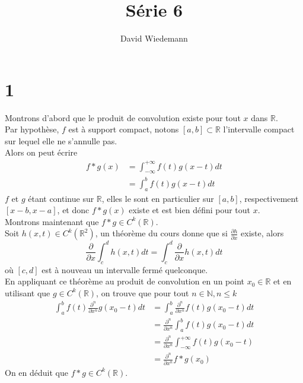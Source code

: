 \documentclass[11pt, a4paper]{article}
\newcommand{\del}{\partial}
\begin{document}
\title{Série 6}
\author{David Wiedemann}
\maketitle
\section*{1}
Montrons d'abord que le produit de convolution existe pour tout $x$ dans $\mathbb{R}$.\\
Par hypothèse, $f$ est à support compact, notons $[a,b]\subset \mathbb{R}$ l'intervalle compact sur lequel elle ne s'annulle pas.\\
Alors on peut écrire
\begin{align*}
	f \ast g ( x) &= \int_{-\infty}^{+\infty} f( t) g( x-t) dt\\
		      &= \int_{ a }^{ b } f( t) g( x-t) dt
\end{align*}
$f$ et $g$ étant continue sur $\mathbb{R}$, elles le sont en particulier sur $[a,b]$, respectivement $[x-b,x-a]$, et donc $f \ast g( x) $ existe et est bien défini pour tout $x$.\\
Montrons maintenant que $f\ast g\in C^{k}( \mathbb{R}) $.\\
Soit $h( x,t) \in C^{k}( \mathbb{R}^{2}) $, un théorème du cours donne que  si $ \frac{\del h}{\del x}$ existe, alors
\[ 
	\frac{\del }{\del x} \int_{ c }^{ d } h( x,t) dt = \int_{ c }^{ d } \frac{\del}{ \del x}h( x,t) dt
\]
où $[c,d]$ est à nouveau un intervalle fermé quelconque.\\
En appliquant ce théorème au produit de convolution  en un point $x_0 \in \mathbb{R}$ et en utilisant que $g \in C^{k}( \mathbb{R}) $, on trouve que pour tout $n \in \mathbb{N}, n \leq k$
\begin{align*}
	\int_{ a }^{ b } f( t)  \frac{\del^{n} }{\del x^{n}} g( x_0-t) dt &= \int_{ a }^{ b } \frac{\del^{n} }{\del x^{n}} f( t) g( x_0-t) dt\\
									&= \frac{\del^{n} }{\del x^{n}} \int_{ a }^{ b } f( t) g( x_0-t) dt\\
									&= \frac{\del^{n} }{\del x^{n}} \int_{-\infty}^{+\infty} f( t) g( x_0-t) \\
									&= \frac{\del^{n} }{\del x^{n}} f \ast g ( x_0) 
\end{align*}
On en déduit que $f \ast g \in C^{k}( \mathbb{R})  $.\\
\end{document}
